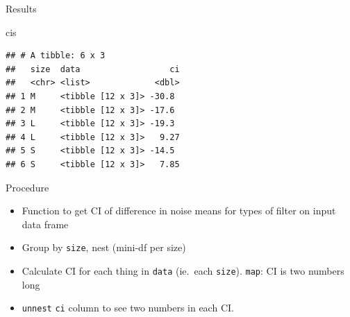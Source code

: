 \documentclass[
  ignorenonframetext,
]{beamer}
\newenvironment{Shaded}{\begin{snugshade}}{\end{snugshade}}
\newcommand{\NormalTok}[1]{#1}
\begin{document}
\begin{frame}[fragile]{Results}
\protect\hypertarget{results}{}

\begin{Shaded}
\begin{Highlighting}[]
\NormalTok{cis}
\end{Highlighting}
\end{Shaded}

\begin{verbatim}
## # A tibble: 6 x 3
##   size  data                  ci
##   <chr> <list>             <dbl>
## 1 M     <tibble [12 x 3]> -30.8 
## 2 M     <tibble [12 x 3]> -17.6 
## 3 L     <tibble [12 x 3]> -19.3 
## 4 L     <tibble [12 x 3]>   9.27
## 5 S     <tibble [12 x 3]> -14.5 
## 6 S     <tibble [12 x 3]>   7.85
\end{verbatim}

\end{frame}

\begin{frame}[fragile]{Procedure}
\protect\hypertarget{procedure}{}

\begin{itemize}
\item
  Function to get CI of difference in noise means for types of filter on
  input data frame
\item
  Group by \texttt{size}, nest (mini-df per size)
\item
  Calculate CI for each thing in \texttt{data} (ie.~each \texttt{size}).
  \texttt{map}: CI is two numbers long
\item
  \texttt{unnest} \texttt{ci} column to see two numbers in each CI.
\end{itemize}

\end{frame}
\end{document}
